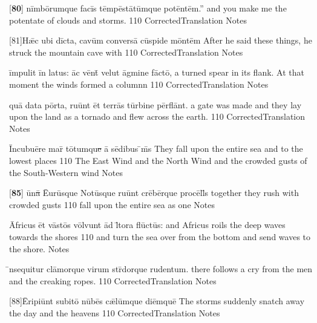 \latline
  {[\textbf{80}] n\=imb\={\macron o}r\-umqu\-e f\-ac\=is t\=emp\=est\={\macron a}t\=umqu\-e p\-ot\=ent\=em.''
}
  { and you make me the potentate of clouds and storms. }
  {110}
  { CorrectedTranslation }
  { Notes }


\latline
  {[81]H\={\ae}c \-ub\-i d\=ict\-a, c\-av\=um c\-onv\-ers\={\macron a} c\=usp\-id\-e m\=ont\=em
}
  { After he said these things, he struck the mountain cave with }
  {110}
  { CorrectedTranslation }
  { Notes }


\latline
  {\=imp\-ul\-it \=in l\-at\-us:  \=ac v\=ent\={\macron {\i}} v\-el\-ut \=agm\-in\-e f\=act\={\macron o},
}
  { a turned spear in its flank.  At that moment the winds formed a columnn }
  {110}
  { CorrectedTranslation }
  { Notes }


\latline
  {qu\={\macron a} d\-at\-a p\=ort\-a, r\-u\=unt \=et t\-err\={\macron a}s t\=urb\-in\-e p\=erfl\=ant.
}
  { a gate was made and they lay upon the land as a tornado and flew across the earth. }
  {110}
  { CorrectedTranslation }
  { Notes }

	\latline
	  {\=Inc\-ub\-u\={\macron e}r\-e m\-ar\={\macron {\i}} t\={\macron o}tumqu\sout{e }\={\macron a} s\={\macron e}d\-ib\-us \={\macron {\i}}m\={\macron {\i}}s
	}  { They fall upon the entire sea and to the lowest places }
	  {110}
	  { The East Wind and the North Wind and the crowded gusts of the South-Western wind  }
	  { Notes }


	\latline
	  {[\textbf{85}] \={\macron u}n\sout{\={\macron a} }\={Eu}r\=usqu\-e N\-ot\=usqu\-e r\-u\=unt cr\={\macron e}b\=erqu\-e pr\-oc\=ell\={\macron {\i}}s
	}
	  { together they rush with crowded gusts }
	  {110}
	  { fall upon the entire sea as one }
	  { Notes }
	

	\latline
	  {\={\macron A}fr\-ic\-us \=et v\=ast\={\macron o}s v\=olvunt \=ad l\={\macron {\i}}t\-or\-a fl\={\macron u}ct\={\macron u}s:
	}
	  { and Africus roils the deep waves towards the shores }
	  {110}
	  { and turn the sea over from the bottom and send waves to the shore. }
	  { Notes }


	\latline
	  {\={\macron {\i}}nsequitur cl\={\macron a}morque virum str\={\macron {\i}}dorque rudentum.
	}
	  { there follows a cry from the men and the creaking ropes. }
	  {110}
	  { CorrectedTranslation }
	  { Notes }

	\latline
	  {[88]\={\macron E}r\-ip\-i\=unt s\-ub\-it\={\macron o} n\={\macron u}b\={\macron e}s c\={\ae}l\=umqu\-e d\-i\=emqu\=e
	}
	  { The storms suddenly snatch away the day and the heavens }
	  {110}
	  { CorrectedTranslation }
	  { Notes }